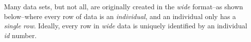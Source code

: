 \documentclass[
  letterpaper,
  DIV=11,
  numbers=noendperiod,
  oneside]{scrartcl}
\begin{document}

Many data sets, but not all, are originally created in the \emph{wide}
format--as shown below--where every row of data is an \emph{individual},
and an individual only has a \emph{single row}. Ideally, every row in
\emph{wide} data is uniquely identified by an individual \emph{id}
number.
\end{document}
